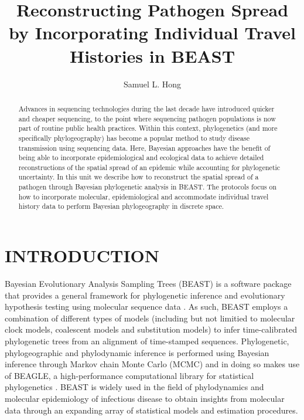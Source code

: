 \documentclass{article}
\title{Reconstructing Pathogen Spread by Incorporating Individual Travel Histories in BEAST}
\author{Samuel L. Hong}
\begin{document}
\maketitle

\begin{abstract}
\begin{adjustwidth}{0.5cm}{0.5cm}
Advances in sequencing technologies during the last decade have introduced quicker and cheaper sequencing, to the point where sequencing pathogen populations is now part of routine public health practices. Within this context, phylogenetics (and more specifically phylogeography) has become a popular method to study disease transmission using sequencing data. Here, Bayesian approaches have the benefit of being able to incorporate epidemiological and ecological data to achieve detailed reconstructions of the spatial spread of an epidemic while accounting for phylogenetic uncertainty. In this unit we describe how to reconstruct the spatial spread of a pathogen through Bayesian phylogenetic analysis in BEAST. The protocols focus on how to incorporate molecular, epidemiological and accommodate individual travel history data to perform Bayesian phylogeography in discrete space. 
\end{adjustwidth}
\end{abstract}

\section*{INTRODUCTION}


Bayesian Evolutionary Analysis Sampling Trees (BEAST) \cite{beast110} is a software package that provides a general framework for phylogenetic inference and evolutionary hypothesis testing using molecular sequence data \cite{beastOG,beast17,beast110}.
As such, BEAST employs a combination of different types of models (including but not limitied to molecular clock models, coalescent models and substitution models) to infer time-calibrated phylogenetic trees from an alignment of time-stamped sequences.
Phylogenetic, phylogeographic and phylodynamic inference is performed using Bayesian inference through Markov chain Monte Carlo (MCMC) and in doing so makes use of BEAGLE, a high-performance computational library for statistical phylogenetics \cite{beagle3}. %
BEAST is widely used in the field of phylodynamics and molecular epidemiology of infectious disease to obtain insights from molecular data through an expanding array of statistical models and estimation procedures. \\
\end{document}
